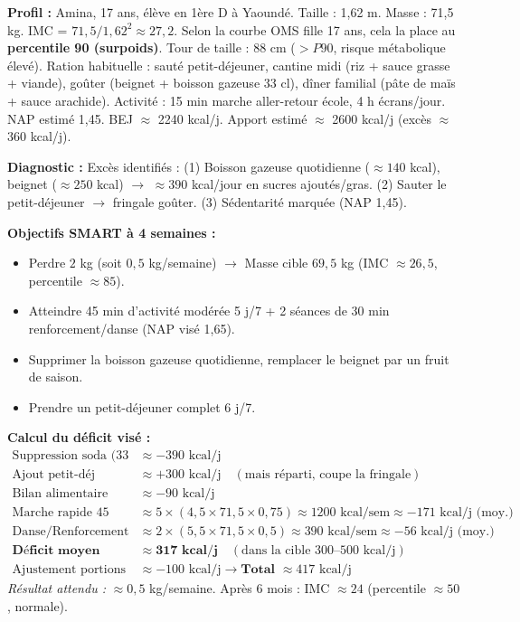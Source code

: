 \documentclass[11pt]{article}
\begin{document}
\begin{exemplebox}
\textbf{Profil :} Amina, 17 ans, élève en 1ère D à Yaoundé. Taille : 1,62 m. Masse : 71,5 kg. IMC = $71,5 / 1,62^2 \approx 27,2$. Selon la courbe OMS fille 17 ans, cela la place au \textbf{percentile 90 (surpoids)}. Tour de taille : 88 cm ($> P90$, risque métabolique élevé). Ration habituelle : sauté petit-déjeuner, cantine midi (riz + sauce grasse + viande), goûter (beignet + boisson gazeuse 33 cl), dîner familial (pâte de maïs + sauce arachide). Activité : 15 min marche aller-retour école, 4 h écrans/jour. NAP estimé 1,45. BEJ $\approx$ 2240 kcal/j. Apport estimé $\approx$ 2600 kcal/j (excès $\approx$ 360 kcal/j).

\textbf{Diagnostic :} Excès identifiés : (1) Boisson gazeuse quotidienne ($\approx 140$ kcal), beignet ($\approx 250$ kcal) $\rightarrow$ $\approx 390$ kcal/jour en sucres ajoutés/gras. (2) Sauter le petit-déjeuner $\rightarrow$ fringale goûter. (3) Sédentarité marquée (NAP 1,45).

\textbf{Objectifs SMART à 4 semaines :}
\begin{itemize}
    \item Perdre $2$ kg (soit $0,5$ kg/semaine) $\rightarrow$ Masse cible $69,5$ kg (IMC $\approx 26,5$, percentile $\approx 85$).
    \item Atteindre 45 min d'activité modérée 5 j/7 + 2 séances de 30 min renforcement/danse (NAP visé 1,65).
    \item Supprimer la boisson gazeuse quotidienne, remplacer le beignet par un fruit de saison.
    \item Prendre un petit-déjeuner complet 6 j/7.
\end{itemize}

\textbf{Calcul du déficit visé :}
\begin{align*}
\text{Suppression soda (33 cl) + beignet} &\approx -390 \text{ kcal/j} \\
\text{Ajout petit-déj équilibré (pain + œuf + fruit)} &\approx +300 \text{ kcal/j} \quad (\text{mais réparti, coupe la fringale}) \\
\text{Bilan alimentaire net} &\approx -90 \text{ kcal/j} \\
\text{Marche rapide 45 min (5 j/sem, MET 4,5)} &\approx 5 \times (4,5 \times 71,5 \times 0,75) \approx 1200 \text{ kcal/sem} \approx -171 \text{ kcal/j (moy.)} \\
\text{Danse/Renforcement 30 min (2 j/sem, MET 5,5)} &\approx 2 \times (5,5 \times 71,5 \times 0,5) \approx 390 \text{ kcal/sem} \approx -56 \text{ kcal/j (moy.)} \\
\textbf{Déficit moyen total (aliment + activité)} &\approx \mathbf{317 \text{ kcal/j}} \quad (\text{dans la cible } 300\text{--}500 \text{ kcal/j}) \\
\text{Ajustement portions dîner (moins sauce/huile)} &\approx -100 \text{ kcal/j} \rightarrow \textbf{Total } \approx 417 \text{ kcal/j}
\end{align*}
\emph{Résultat attendu :} $\approx 0,5$ kg/semaine. Après 6 mois : IMC $\approx 24$ (percentile $\approx 50$, normale).
\end{exemplebox}
\end{document}
